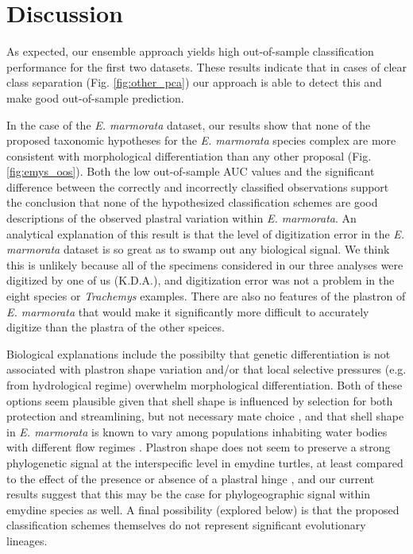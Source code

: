 \documentclass[11pt]{article}
\begin{document}
\section*{Discussion}
As expected, our ensemble approach yields high out-of-sample classification performance for the first two datasets. These results indicate that in cases of clear class separation (Fig. \ref{fig:other_pca}) our approach is able to detect this and make good out-of-sample prediction.

In the case of the \textit{E. marmorata} dataset, our results show that none of the proposed taxonomic hypotheses for the \textit{E. marmorata} species complex are more consistent with morphological differentiation than any other proposal (Fig. \ref{fig:emys_oos}). Both the low out-of-sample AUC values and the significant difference between the correctly and incorrectly classified observations support the conclusion that none of the hypothesized classification schemes are good descriptions of the observed plastral variation within \textit{E. marmorata}. An analytical explanation of this result is that the level of digitization error in the \textit{E. marmorata} dataset is so great as to swamp out any biological signal. We think this is unlikely because all of the specimens considered in our three analyses were digitized by one of us (K.D.A.), and digitization error was not a problem in the eight species or \textit{Trachemys} examples. There are also no features of the plastron of \textit{E. marmorata} that would make it significantly more difficult to accurately digitize than the plastra of the other speices.

Biological explanations include the possibilty that genetic differentiation is not associated with plastron shape variation and/or that local selective pressures (e.g. from hydrological regime) overwhelm morphological differentiation. Both of these options seem plausible given that shell shape is influenced by selection for both protection and streamlining, but not necessary mate choice \citep{Rivera2008,Rivera2011,Stayton2011,Rivera2014,Polly2016}, and that shell shape in \textit{E. marmorata} is known to vary among populations inhabiting water bodies with different flow regimes \citep{Holland1992,Lubcke2007,Germano2009}. Plastron shape does not seem to preserve a strong phylogenetic signal at the interspecific level in emydine turtles, at least compared to the effect of the presence or absence of a plastral hinge \citep{Angielczyk2011}, and our current results suggest that this may be the case for phylogeographic signal within emydine species as well. A final possibility (explored below) is that the proposed classification schemes themselves do not represent significant evolutionary lineages.
\end{document}
